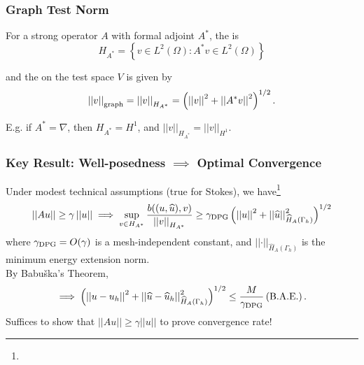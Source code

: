 \documentclass[mathserif]{beamer}
\newcommand{\NVRnorm}[1]{\left|\left|#1\right|\right|}
\newcommand{\NVRgrad}{\nabla}
\newcommand{\pecosbold}[1]{{\color{pecos2}{#1}}}
\newcommand{\FootSize}{\scriptsize}
\begin{document}
\begin{frame}
\frametitle{Graph Test Norm}

For a strong operator $A$ with formal adjoint $A^{*}$, the \pecosbold{adjoint graph space} is
\[
H_{A^{*}} = \left\{ v \in L^{2}(\Omega) : A^{*}v \in L^{2}(\Omega) \right\}
\]

and the \pecosbold{(adjoint) graph norm} on the test space $V$ is given by
\[
\NVRnorm{v}_{\rm graph} = \NVRnorm{v}_{H_{A^{*}}} = \left( \NVRnorm{v}^{2} + \NVRnorm{A^{*}v}^{2}\right)^{1/2}.
\]

\vspace{5mm}
\begin{center}
E.g. if $A^{*} = \NVRgrad$, then $H_{A^{*}} = H^{1}$, and $\NVRnorm{v}_{H_{A^{*}}} = \NVRnorm{v}_{H^{1}}$.
\end{center}
\end{frame}

\begin{frame}
\frametitle{Key Result: Well-posedness $\implies$ Optimal Convergence}
Under modest technical assumptions (true for Stokes), we have\footnote{\FootSize {}}\\
\[
\NVRnorm{Au} \geq \gamma \NVRnorm{u} \implies \sup_{v \in H_{A^{*}}} \frac{b((u,\widehat{u}),v)}{\NVRnorm{v}_{H_{A^{*}}}} \geq \gamma_{\rm DPG} \left(\NVRnorm{u}^{2} + \NVRnorm{\widehat{u}}^{2}_{\widehat{H}_{A}(\Gamma_{h})}\right)^{1/2}
\]
where $\gamma_{\rm DPG} = O(\gamma)$ is a mesh-independent constant, and $\NVRnorm{\cdot}_{\widehat{H}_{A}(\Gamma_{h})}$ is the minimum energy extension norm.\\
\pause
\vspace{5mm}
By Babu\v{s}ka's Theorem,
\[
\implies \left(\NVRnorm{u - u_{h}}^{2} + \NVRnorm{\widehat{u} - \widehat{u}_{h}}^{2}_{\widehat{H}_{A}(\Gamma_{h})}\right)^{1/2} \leq \frac{M}{\gamma_{\rm DPG}} \left( {\rm B.A.E.} \right).
\]
\pause
Suffices to show that $\NVRnorm{Au} \geq \gamma \NVRnorm{u}$ to prove \pecosbold{optimal} convergence rate!
\end{frame}
\end{document}
